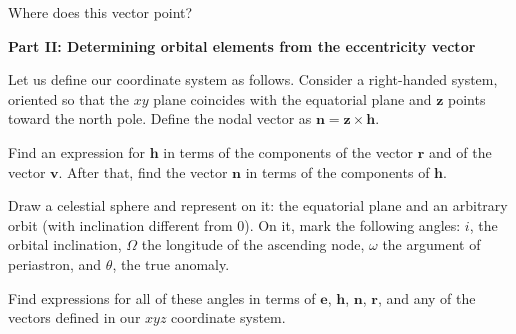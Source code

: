 \documentclass[11pt]{article}
\begin{document}
\begin{pproblem}
\begin{alternativas}
        Where does this vector point?
    \end{alternativas}
    \begin{center}
        \textbf{Part II: Determining orbital elements from the eccentricity vector}     
    \end{center}
    Let us define our coordinate system as follows. Consider a right-handed system, oriented so that the \(xy\) plane coincides with the equatorial plane and \(\mathbf{z}\) points toward the north pole. Define the nodal vector as \(\mathbf{n} = \mathbf{z} \times \mathbf{h}\).
    \begin{alternativas}
        \item Find an expression for \(\mathbf{h}\) in terms of the components of the vector \(\mathbf{r}\) and of the vector \(\mathbf{v}\). After that, find the vector \(\mathbf{n}\) in terms of the components of \(\mathbf{h}\).

        \item Draw a celestial sphere and represent on it: the equatorial plane and an arbitrary orbit (with inclination different from 0). On it, mark the following angles: \(i\), the orbital inclination, \(\Omega\) the longitude of the ascending node, \(\omega\) the argument of periastron, and \(\theta\), the true anomaly. 

        \item Find expressions for all of these angles in terms of \(\mathbf{e}\), \(\mathbf{h}\), \(\mathbf{n}\), \(\mathbf{r}\), and any of the vectors defined in our \(xyz\) coordinate system.
    \end{alternativas}

   
\end{pproblem}
\end{document}
